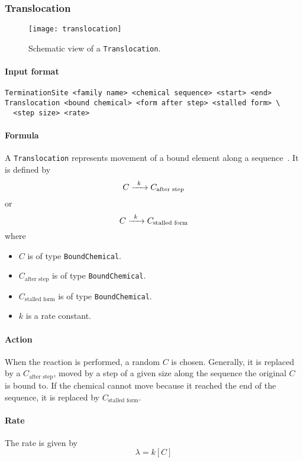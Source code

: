 \subsubsection{Translocation}

\begin{figure}[!h]
  \centering
  \texttt{[image: translocation]}
  \caption{Schematic view of a \texttt{Translocation}.}
\label{fig:translocation}
\end{figure}

\paragraph{Input format}
\begin{verbatim}
TerminationSite <family name> <chemical sequence> <start> <end>
Translocation <bound chemical> <form after step> <stalled form> \
  <step size> <rate>
\end{verbatim}

\paragraph{Formula}
A \texttt{Translocation} represents movement of a bound element along a sequence~.
It is defined by
\[
	\reactionIrr{C}{C_\text{after step}}{k}{}
\]
or
\[
	\reactionIrr{C}{C_\text{stalled form}}{k}{}
\]
where
\begin{itemize}
	\item $C$ is of type \texttt{BoundChemical}.
	\item $C_\text{after step}$ is of type \texttt{BoundChemical}.
	\item $C_\text{stalled form}$ is of type \texttt{BoundChemical}.
	\item $k$ is a rate constant.
\end{itemize}

\paragraph{Action}
When the reaction is performed, a random $C$ is chosen.
Generally, it is replaced by a $C_\text{after step}$,
moved by a step of a given size along the sequence the original $C$ is bound to.
If the chemical cannot move because it reached the end of the sequence,
it is replaced by $C_\text{stalled form}$.

\paragraph{Rate} The rate is given by
\[
	\lambda = k [C]
\]

